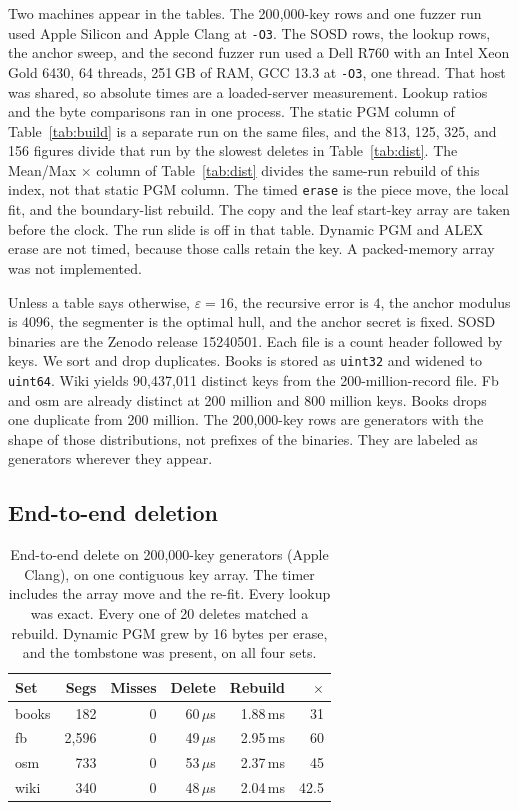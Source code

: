 \documentclass[conference]{IEEEtran}
\begin{document}
Two machines appear in the tables.
The 200{,}000-key rows and one fuzzer run used Apple Silicon and Apple Clang at \texttt{-O3}.
The SOSD rows, the lookup rows, the anchor sweep, and the second fuzzer run used a Dell R760 with an Intel Xeon Gold 6430, 64 threads, 251\,GB of RAM, GCC 13.3 at \texttt{-O3}, one thread.
That host was shared, so absolute times are a loaded-server measurement.
Lookup ratios and the byte comparisons ran in one process.
The static PGM column of Table~\ref{tab:build} is a separate run on the same files, and the 813, 125, 325, and 156 figures divide that run by the slowest deletes in Table~\ref{tab:dist}.
The Mean/Max $\times$ column of Table~\ref{tab:dist} divides the same-run rebuild of this index, not that static PGM column.
The timed \texttt{erase} is the piece move, the local fit, and the boundary-list rebuild. The copy and the leaf start-key array are taken before the clock. The run slide is off in that table. Dynamic PGM and ALEX erase are not timed, because those calls retain the key. A packed-memory array was not implemented.

Unless a table says otherwise, $\varepsilon=16$, the recursive error is $4$, the anchor modulus is $4096$, the segmenter is the optimal hull, and the anchor secret is fixed.
SOSD binaries are the Zenodo release 15240501.
Each file is a count header followed by keys.
We sort and drop duplicates.
Books is stored as \texttt{uint32} and widened to \texttt{uint64}.
Wiki yields 90{,}437{,}011 distinct keys from the 200-million-record file.
Fb and osm are already distinct at 200 million and 800 million keys.
Books drops one duplicate from 200 million.
The 200{,}000-key rows are generators with the shape of those distributions, not prefixes of the binaries.
They are labeled as generators wherever they appear.

\subsection{End-to-end deletion}

\begin{table}[t]
\caption{End-to-end delete on 200{,}000-key generators (Apple Clang), on one contiguous key array.
The timer includes the array move and the re-fit.
Every lookup was exact.
Every one of 20 deletes matched a rebuild.
Dynamic PGM grew by 16 bytes per erase, and the tombstone was present, on all four sets.}
\label{tab:e2e}
\centering
\footnotesize
\begin{tabular}{@{}lrrrrr@{}}
\toprule
Set & Segs & Misses & Delete & Rebuild & $\times$ \\
\midrule
books & 182 & 0 & 60\,$\mu$s & 1.88\,ms & 31 \\
fb    & 2{,}596 & 0 & 49\,$\mu$s & 2.95\,ms & 60 \\
osm   & 733 & 0 & 53\,$\mu$s & 2.37\,ms & 45 \\
wiki  & 340 & 0 & 48\,$\mu$s & 2.04\,ms & 42.5 \\
\bottomrule
\end{tabular}
\end{table}
\end{document}
